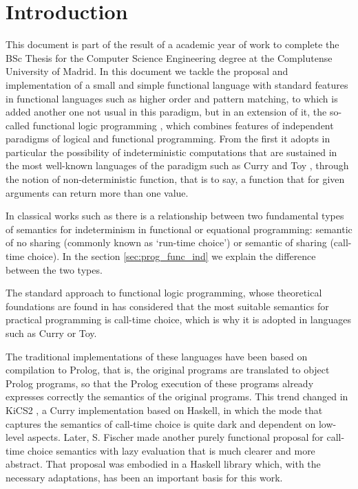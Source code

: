 \documentclass[class=article, crop=false]{standalone}
\begin{document}
\section{Introduction}

This document is part of the result of a academic year of work to complete the BSc Thesis for
the Computer Science Engineering degree at the Complutense University of Madrid. In this
document we tackle the proposal and implementation of a small and simple functional language
with standard features in functional languages such as higher order and pattern matching, to
which is added another one not usual in this paradigm, but in an extension of it, the
so-called functional logic programming \cite{antoy2010functional}, which combines features of
independent paradigms of logical and functional programming. From the first it adopts in
particular the possibility of indeterministic computations that are sustained in the most
well-known languages of the paradigm such as Curry \cite{Hanus16Curry} and Toy
\cite{fraguas1999toy}, through the notion of non-deterministic function, that is to say, a
function that for given arguments can return more than one value.

In classical works such as \cite{hussmann1993nondeterminism} there is a relationship between
two fundamental types of semantics for indeterminism in functional or equational programming:
semantic of no sharing (commonly known as `run-time choice') or semantic of sharing
(call-time choice). In the section \ref{sec:prog_func_ind} we explain the difference between
the two types.

The standard approach to functional logic programming, whose theoretical foundations are
found in \cite{DBLP:journals/jlp/Gonzalez-MorenoHLR99} has considered that the most suitable
semantics for practical programming is call-time choice, which is why it is adopted in
languages such as Curry or Toy.

The traditional implementations of these languages have been based on compilation to Prolog,
that is, the original programs are translated to object Prolog programs, so that the Prolog
execution of these programs already expresses correctly the semantics of the original
programs. This trend changed in KiCS2 \cite{BrasselHanusPeemoellerReck11}, a Curry
implementation based on Haskell, in which the mode that captures the semantics of call-time
choice is quite dark and dependent on low-level aspects. Later, S. Fischer made another
purely functional proposal for call-time choice semantics with lazy
evaluation \cite{fischer2011purely} that is much clearer and more abstract. That proposal was
embodied in a Haskell library which, with the necessary adaptations, has been an important
basis for this work.
\end{document}
